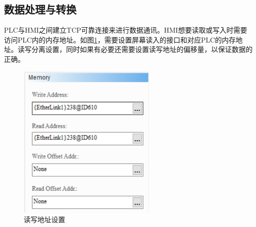 \documentclass[UTF8]{article}
\begin{document}
\subsection{数据处理与转换}
PLC与HMI之间建立TCP可靠连接来进行数据通讯。HMI想要读取或写入时需要访问PLC内的内存地址。如图\ref{fig:img14}，需要设置屏幕读入的接口和对应PLC的内存地址。读写分离设置，同时如果有必要还需要设置读写地址的偏移量，以保证数据的正确。
\begin{figure}[H]
    \centering %
    \includegraphics[width=0.6\textwidth]{figure/读写地址设置.png} 
    \caption{读写地址设置} %
    \label{fig:img14} %
\end{figure}
\end{document}
